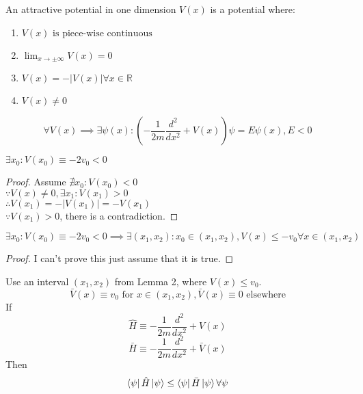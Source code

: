 \newpage
\begin{sol}
\begin{theorem}
An attractive potential in one dimension $V(x)$ is a potential where:
\begin{enumerate}
\item $V(x) \text{ is piece-wise continuous}$
\item $\lim_{x\to\pm\infty}V(x)=0$
\item $V(x)=-|V(x)|\forall x\in\mathbb{R}$
\item $V(x)\neq 0$ 
\end{enumerate}
\begin{equation}
	\forall V(x)\implies \exists\psi(x):\left(-\frac{1}{2m}\frac{d^2}{dx^2}+V(x)\right)\psi=E\psi(x), E<0
\end{equation}
\end{theorem}
\begin{lemma}
$\exists x_0:V(x_0)\equiv -2v_0<0$ 
\end{lemma}
\begin{proof}
Assume $\nexists x_0:V(x_0)<0$\\
$\because V(x)\neq 0, \exists x_1:V(x_1)>0$ \\
$\therefore V(x_1)=-|V(x_1)|=-V(x_1)$\\
$\because V(x_1)>0$, there is a contradiction.
\end{proof}
\begin{lemma}
$\exists x_0:V(x_0)\equiv -2v_0<0\implies\exists (x_1, x_2):x_0\in (x_1, x_2),V(x)\leq -v_0\forall x\in(x_1, x_2)$ 
\end{lemma}
\begin{proof}
I can't prove this just assume that it is true.
\end{proof}
\begin{lemma}
Use an interval $(x_1,x_2)$ from Lemma 2, where $V(x)\leq v_0$.
\begin{equation}
	\bar{V}(x)\equiv v_0 \text{ for } x\in(x_1,x_2),\bar{V}(x)\equiv 0 \text{ elsewhere}
\end{equation}
If
\begin{equation}
	\hat{H}\equiv -\frac{1}{2m}\frac{d^2}{dx^2}+V(x)
\end{equation}
\begin{equation}
	\bar{H}\equiv -\frac{1}{2m}\frac{d^2}{dx^2}+\bar V(x)
\end{equation}
Then
\begin{equation}
	\bra\psi\hat H\ket\psi\leq\bra\psi\bar H\ket\psi\forall\psi
\end{equation}

\end{lemma}
\end{sol}
